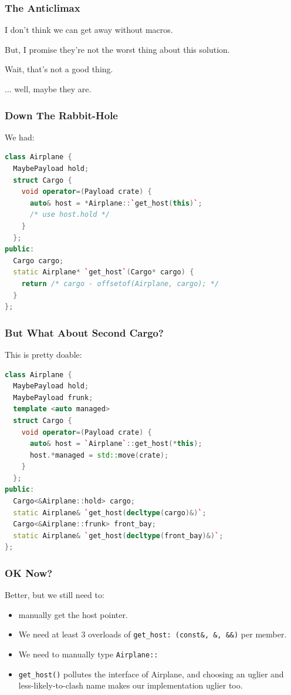 \documentclass{beamer}
\def\code#1{\texttt{#1}}
\newcommand{\nl}{\vspace{0.2\baselineskip}}
\begin{document}
\begin{frame}
  \frametitle{The Anticlimax}
\begin{center}
  I don't think we can get away without macros. \nl \nl \pause

  But, I promise they're not the worst thing about this solution. \nl \nl \pause

  Wait, that's not a good thing. \nl \nl \nl \nl \nl \pause

  ... well, maybe they are.
\end{center}
\end{frame}


\begin{frame}[fragile]
\frametitle{Down The Rabbit-Hole}
\begin{center}
  We had:
\end{center}
\begin{lstlisting}[language=cpp]
class Airplane {
  MaybePayload hold;
  struct Cargo {
    void operator=(Payload crate) {
      auto& host = *Airplane::`get_host(this)`;
      /* use host.hold */
    }
  };
public:
  Cargo cargo;
  static Airplane* `get_host`(Cargo* cargo) {
    return /* cargo - offsetof(Airplane, cargo); */
  }
};
\end{lstlisting}
\end{frame}


\begin{frame}[fragile]
\frametitle{But What About Second Cargo?}
\begin{center}
  This is pretty doable:
\end{center}
\begin{lstlisting}[language=cpp]
class Airplane {
  MaybePayload hold;
  MaybePayload frunk;
  template <auto managed>
  struct Cargo {
    void operator=(Payload crate) {
      auto& host = `Airplane`::get_host(*this);
      host.*managed = std::move(crate);
    }
  };
public:
  Cargo<&Airplane::hold> cargo;
  static Airplane& `get_host(decltype(cargo)&)`;
  Cargo<&Airplane::frunk> front_bay; 
  static Airplane& `get_host(decltype(front_bay)&)`;
};
\end{lstlisting}
\end{frame}


\begin{frame}[fragile]
\frametitle{OK Now?}
\begin{center}
  Better, but we still need to:
\end{center}
\begin{itemize}
  \item manually get the host pointer.
  \item We need at least 3 overloads of \code{get\_host: (const\&, \&, \&\&)}
    per member.
  \item We need to manually type \code{Airplane::}
  \item \code{get\_host()} pollutes the interface of Airplane, and choosing an
    uglier and less-likely-to-clash name makes our implementation uglier too.
\end{itemize}

\end{frame}
\end{document}
